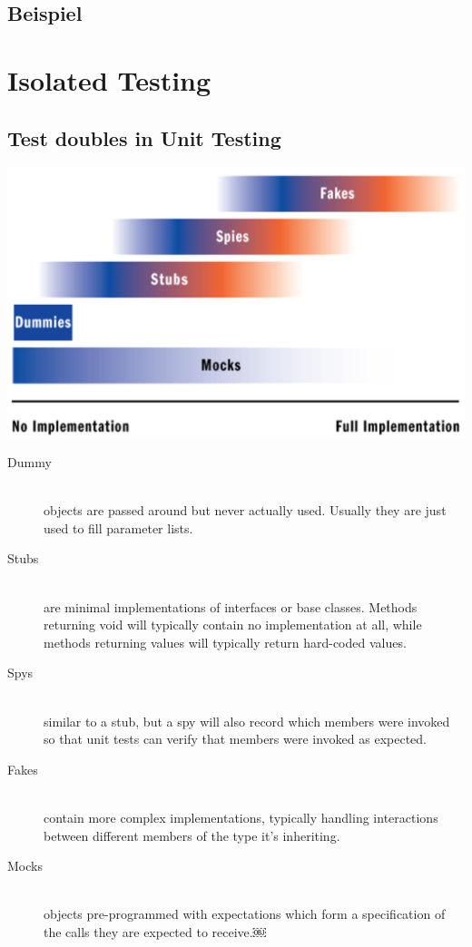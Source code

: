 \documentclass[a4paper,10pt]{article}
\begin{document}
\subsection{Beispiel}


\newpage
\section{Isolated Testing}

\subsection{Test doubles in Unit Testing}
\includegraphics[scale=0.8]{test_doubles.png}
\begin{description}
	\item[Dummy] \hfill \\ objects are passed around but never actually used. Usually they are just used to fill parameter lists.
	\item[Stubs] \hfill \\ are minimal implementations of interfaces or base classes. Methods returning void will typically contain no implementation at all, while methods returning values will typically return hard-coded values.
	\item[Spys] \hfill \\ similar to a stub, but a spy will also record which members were invoked so that unit tests can verify that members were invoked as expected.
	\item[Fakes] \hfill \\ contain more complex implementations, typically handling interactions between different members of the type it's inheriting.
	\item[Mocks] \hfill \\ objects pre-programmed with expectations which form a specification of the calls they are expected to receive.￼
\end{description}
\end{document}
